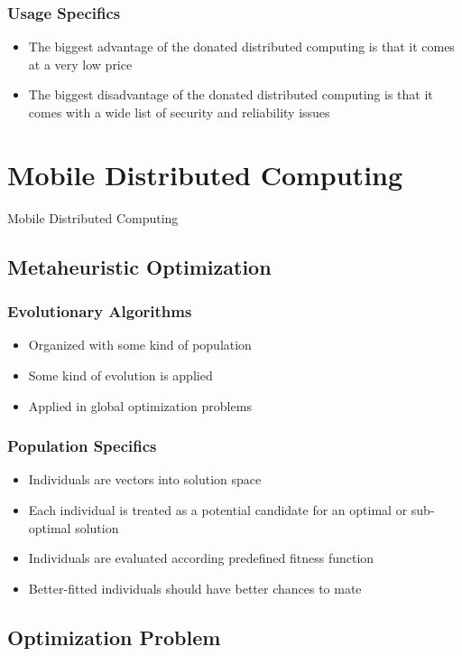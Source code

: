 \documentclass{beamer}
\begin{document}
\begin{frame}
\frametitle{Usage Specifics}
\begin{itemize}
	\item The biggest advantage of the donated distributed computing is that it comes at a very low price
	\item The biggest disadvantage of the donated distributed computing is that it comes with a wide list of security and reliability issues
\end{itemize}
\end{frame}

\section{Mobile Distributed Computing}

\begin{frame}
\center \huge{Mobile Distributed Computing}
\end{frame}

\subsection{Metaheuristic Optimization}

\begin{frame}
\frametitle{Evolutionary Algorithms}
\begin{itemize}
	\item Organized with some kind of population
	\item Some kind of evolution is applied
	\item Applied in global optimization problems
\end{itemize}
\end{frame}

\begin{frame}
\frametitle{Population Specifics}
\begin{itemize}
	\item Individuals are vectors into solution space
	\item Each individual is treated as a potential candidate for an optimal or sub-optimal solution
	\item Individuals are evaluated according predefined fitness function
	\item Better-fitted individuals should have better chances to mate
\end{itemize}
\end{frame}

\subsection{Optimization Problem}
\end{document}
